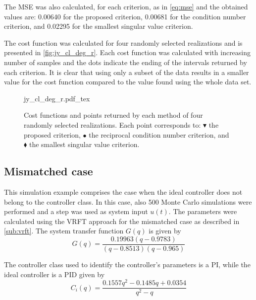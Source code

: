 The MSE was also calculated, for each criterion, as in \eqref{eq:mse} and the obtained values are: 0.00640 for the proposed criterion, 0.00681 for the condition number criterion, and 0.02295 for the smallest singular value criterion.

The cost function was calculated for four randomly selected realizations and is presented in \autoref{fig:jy_cl_deg_r}.
Each cost function was calculated with increasing number of samples and the dots indicate the ending of the intervals returned by each criterion.
It is clear that using only a subset of the data results in a smaller value for the cost function compared to the value found using the whole data set.
\begin{figure}[h!]
  \centering
  \def\svgwidth{\columnwidth}
  {\footnotesize{jy_cl_deg_r.pdf_tex}}
  \caption{\label{fig:jy_cl_deg_r} Cost functions and points returned by each method of four randomly selected realizations. Each point corresponds to: $\blacktriangledown$ the proposed criterion, $\bullet$ the reciprocal condition number criterion, and $\blacklozenge$ the smallest singular value criterion.}
\end{figure}

%
%

\subsection{Mismatched case}
This simulation example comprises the case when the ideal controller does not belong to the controller class.
In this case, also 500 Monte Carlo simulations were performed and a step was used as system input $u(t)$.
The parameters were calculated using the VRFT approach for the mismatched case as described in \autoref{sub:vrft}.
The system transfer function $G(q)$ is given by
\[
	G(q) = \frac{0.19963 (q-0.9783)}{(q-0.8513) (q-0.965)}
\]

The controller class used to identify the controller's parameters is a PI, while the ideal controller is a PID given by
\[
	C_i(q) = \frac{0.1557 q^2 - 0.1485 q + 0.0354}{q^2 - q}
\]

